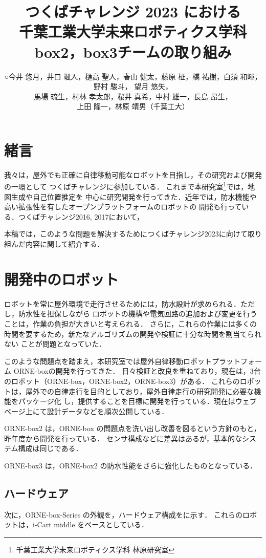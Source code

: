 \documentclass[twocolumn, 9pt]{jsproceedings}
\title{つくばチャレンジ 2023 における\\千葉工業大学未来ロボティクス学科 box2，box3チームの取り組み}
\author{○今井 悠月，井口 颯人，樋高 聖人，春山 健太，藤原 柾，\CID{8705}橋 祐樹，白須 和暉，野村 駿斗，
望月 悠矢，\\馬場 琉生，村林 孝太郎，桜井 真希，中村 雄一，長島 昂生，\\上田 隆一，林原 靖男（千葉工大）}
\affiliation{千葉工業大学未来ロボティクス学科 box2, box3チーム}
\begin{document}
\maketitle

\section{緒言}
我々は，屋外でも正確に自律移動可能なロボットを目指し，その研究および開発の一環として
つくばチャレンジに参加している．
これまで本研究室\footnote{千葉工業大学未来ロボティクス学科 林原研究室}では，地図生成や自己位置推定を
中心に研究開発を行ってきた．近年では，防水機能や高い拡張性を有したオープンプラットフォームのロボットの
開発も行っている．つくばチャレンジ2016, 2017において，

本稿では，このような問題を解決するためにつくばチャレンジ2023に向けて取り組んだ内容に関して紹介する．

\section{開発中のロボット}
ロボットを常に屋外環境で走行させるためには，防水設計が求められる．ただし，防水性を担保しながら
ロボットの機構や電気回路の追加および変更を行うことは，作業の負担が大きいと考えられる．
さらに，これらの作業には多くの時間を要するため，新たなアルゴリズムの開発や検証に十分な時間を割当てられない
ことが問題となっていた．

このような問題点を踏まえ，本研究室では屋外自律移動ロボットプラットフォーム ORNE-boxの開発を行ってきた．
日々検証と改良を重ねており，現在は，3台のロボット（ORNE-box，ORNE-box2，ORNE-box3）がある．
これらのロボットは，屋外での自律走行を目的としており，屋外自律走行の研究開発に必要な機能をパッケージ化
し，提供することを目標に開発を行っている．現在はウェブページ上にて設計データなどを順次公開している．

ORNE-box2 は，ORNE-box の問題点を洗い出し改善を図るという方針のもと，昨年度から開発を行っている．
センサ構成などに差異はあるが，基本的なシステム構成は同じである．

ORNE-box3 は，ORNE-box2 の防水性能をさらに強化したものとなっている．

\subsection{ハードウェア}
次に，ORNE-box-Series の外観を，ハードウェア構成をに示す．
これらのロボットは，i-Cart middle をベースとしている．\\
\end{document}
